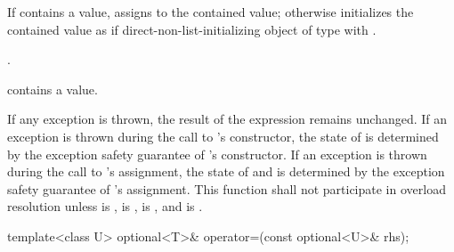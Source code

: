 \begin{itemdescr}
\pnum
\effects
If  contains a value, assigns  to the contained value; otherwise initializes the contained value as if direct-non-list-initializing object of type  with .

\pnum
\returns
{}.

\pnum
\postconditions
{} contains a value.

\pnum
\remarks
If any exception is thrown, the result of the expression  remains unchanged. If an exception is thrown during the call to 's constructor, the state of  is determined by the exception safety guarantee of 's constructor. If an exception is thrown during the call to 's assignment, the state of  and  is determined by the exception safety guarantee of 's assignment.
This function shall not participate in overload resolution unless
 is ,
 is ,
 is , and
 is .
\end{itemdescr}

%
\begin{itemdecl}
template<class U> optional<T>& operator=(const optional<U>& rhs);
\end{itemdecl}

